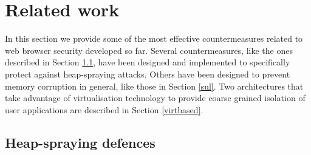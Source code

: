 

\clearpage
\section{Related work}\label{bub:related}
In this section we provide some of the most effective countermeasures related to web browser security developed so far. Several countermeasures, like the ones described in Section \ref{cmnozzle}, have been designed and implemented to specifically protect against heap-spraying attacks. Others have been designed to prevent memory corruption in general, like those in Section \ref{sul}. 
Two architectures that take advantage of virtualisation technology to provide coarse grained isolation of user applications are described in Section \ref{virtbased}. 

\subsection{Heap-spraying defences} \label{cmnozzle}

